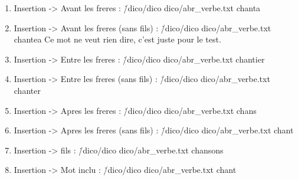 \documentclass{report}
\begin{document}
\begin{enumerate}
    \item Insertion -> Avant les freres : \./dico/dico dico/abr\_verbe.txt chanta
\vspace{0.5cm}

\vspace{0.5cm}

    \item Insertion -> Avant les freres (sans fils) : \./dico/dico dico/abr\_verbe.txt chantea
Ce mot ne veut rien dire, c'est juste pour le test.
\vspace{0.5cm}

\vspace{0.5cm}

    \item Insertion -> Entre les freres : \./dico/dico dico/abr\_verbe.txt chantier
\vspace{0.5cm}

\vspace{0.5cm}

    \item Insertion -> Entre les freres (sans fils) : \./dico/dico dico/abr\_verbe.txt chanter
\vspace{0.5cm}

\vspace{0.5cm}

    \item Insertion -> Apres les freres : \./dico/dico dico/abr\_verbe.txt chans
\vspace{0.5cm}

\vspace{0.5cm}

    \item Insertion -> Apres les freres (sans fils) : \./dico/dico dico/abr\_verbe.txt chant
\vspace{0.5cm}

\vspace{0.5cm}

    \item Insertion -> fils : \./dico/dico dico/abr\_verbe.txt chansons
\vspace{0.5cm}

\vspace{0.5cm}

    \item Insertion -> Mot inclu : \./dico/dico dico/abr\_verbe.txt chant
\vspace{0.5cm}

\vspace{0.5cm}


\end{enumerate}
\end{document}
